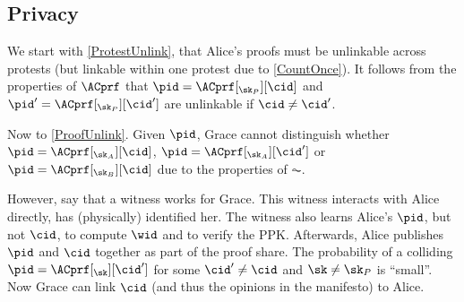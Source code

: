 %
%

\subsection{Privacy}

We start with \cref{ProtestUnlink}, that Alice's proofs must be unlinkable 
across protests (but linkable within one protest due to \cref{CountOnce}).
It follows from the properties of \(\ACprf\) that \(\pid = 
  \ACprf[_{\sk_P}][\cid]\) and \(\pid' = \ACprf[_{\sk_P}][\cid']\) are 
unlinkable if \(\cid\neq \cid'\).

Now to \cref{ProofUnlink}.
Given \(\pid\), Grace cannot distinguish whether \(\pid = 
  \ACprf[_{\sk_A}][\cid]\), \(\pid = \ACprf[_{\sk_A}][\cid']\) or \(\pid = 
  \ACprf[_{\sk_B}][\cid]\) due to the properties of \(\AC\).

However, say that a witness works for Grace.
This witness interacts with Alice directly, \ie has (physically) identified her.
The witness also learns Alice's \(\pid\), but not \(\cid\), to compute \(\wid\) 
and to verify the \ac{PPK}.
Afterwards, Alice publishes \(\pid\) and \(\cid\) together as part of the proof 
share.
The probability of a colliding \(\pid = \ACprf[_\sk][\cid']\) for some \(\cid' 
  \neq \cid\) and \(\sk \neq \sk_P\) is \enquote{small}.
Now Grace can link \(\cid\) (and thus the opinions in the manifesto) to Alice.
